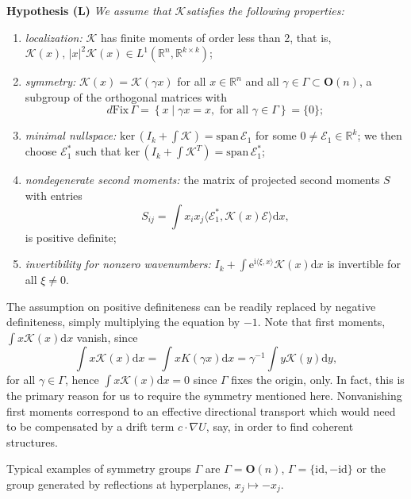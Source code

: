 \documentclass[10pt]{article}
\newenvironment{Hypothesis}[1]%
  {\begin{trivlist}\item[]{\bf Hypothesis #1 }\em}{\end{trivlist}}
\newcommand{\R}{\mathbb{R}}
\newcommand{\Ns}{\mathrm{ker\,}}
\newcommand{\rmd}{\mathrm{d}}
\newcommand{\rme}{\mathrm{e}}
\newcommand{\rmi}{\mathrm{i}}
\newcommand{\K}{\mathcal{K}}
\begin{document}
\begin{Hypothesis}{(L)}We assume that  $\K$satisfies the following properties:
\begin{enumerate}
\item \emph{localization:  }$\K$ has finite moments of order less than 2, that is, $\K(x),\, |x|^2\K(x) \in L^1(\R^n,\R^{k\times k})$;
\item \emph{symmetry: } $\K(x)=\K(\gamma x)$ for all $x\in\R^n$ and all $\gamma \in \Gamma\subset \mathbf{O}(n)$, a subgroup of the orthogonal matrices with 
\[
d\mathrm{Fix}\, \Gamma=\left\{x\mid\gamma x=x, \mbox{ for all } \gamma\in\Gamma\right\}=\{0\};
\]

\item \emph{minimal nullspace: } $\Ns(I_k+\int\K)=\mathrm{span}\, \mathcal{E}_1$ for some  $ 0\neq \mathcal{E}_1\in \R^k$; we then choose $\mathcal{E}_1^*$ such that   $\Ns(I_k+\int\K^T)=\mathrm{span}\, \mathcal{E}_1^*$;
\item \emph{nondegenerate second moments:}  the matrix of projected second moments $S$ with entries 
\[
S_{ij}=\int x_ix_j \langle\mathcal{E}_1^*,\K(x) \mathcal{E}\rangle\rmd x,
\]
is positive definite;
\item \emph{invertibility for nonzero wavenumbers: } $I_k+ \int \rme^{\rmi \langle \xi,x\rangle}\K(x)\rmd x$ is invertible for all $\xi\neq 0$. 
\end{enumerate}
\end{Hypothesis}
The assumption on positive definiteness can be readily replaced by negative definiteness, simply multiplying the equation by $-1$. 
Note that first moments, $\int x\K(x)\rmd x$ vanish, since
\[
\int x \K(x)\rmd x=\int x K(\gamma x)\rmd x= \gamma^{-1}\int y \K(y)\rmd y,
\]
for all $\gamma\in \Gamma$, hence $\int x \K(x)\rmd x=0$ since $\Gamma$ fixes the origin, only. In fact, this is the primary reason for us to require the symmetry mentioned here. Nonvanishing first moments correspond to an effective directional transport which would need to be compensated by a drift term $c\cdot \nabla U$, say, in order to find coherent structures. 

Typical examples of symmetry groups $\Gamma$ are $\Gamma=\mathbf{O}(n)$, $\Gamma=\{\mathrm{id},-\mathrm{id}\}$ or the group generated by reflections at hyperplanes, $x_j\mapsto -x_j$. 
\end{document}
